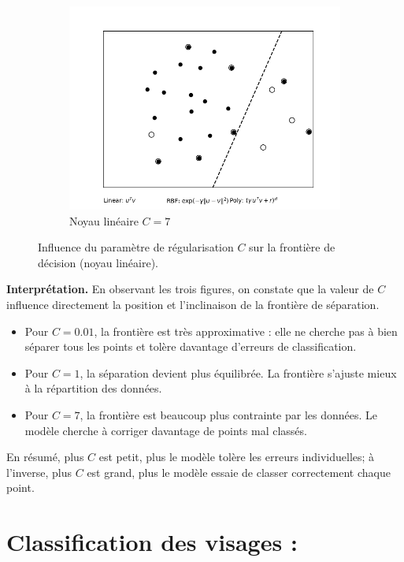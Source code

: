 \documentclass[12pt]{article}
\begin{document}
\begin{figure}[H]
\begin{subfigure}{0.32\textwidth}
        \includegraphics[width=\linewidth]{images/linC=7.png}
        \caption{Noyau linéaire $C=7$}
    \end{subfigure}
    \caption{Influence du paramètre de régularisation $C$ sur la frontière de décision (noyau linéaire).}
\end{figure}

\noindent
\textbf{Interprétation.}  
En observant les trois figures, on constate que la valeur de $C$ influence directement 
la position et l’inclinaison de la frontière de séparation. 

\begin{itemize}
    \item Pour $C=0.01$, la frontière est très approximative : elle ne cherche pas à bien séparer tous les points et tolère davantage d’erreurs de classification.
    \item Pour $C=1$, la séparation devient plus équilibrée. La frontière s’ajuste mieux à la répartition des données.
    \item Pour $C=7$, la frontière est beaucoup plus contrainte par les données. Le modèle cherche à corriger davantage de points mal classés.
\end{itemize}

En résumé, plus $C$ est petit, plus le modèle tolère les erreurs individuelles; à l’inverse, plus $C$ est grand, plus le modèle essaie de classer correctement chaque point.









\section{Classification des visages :}
\end{document}

